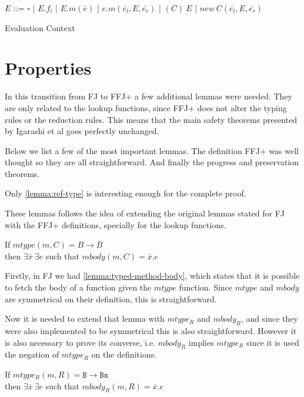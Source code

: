 \begin{table}[h!]
    \centering
    $E$ ::= $\square$ | $E.f_i$ | $E.m(\bar{e})$ | $e.m(\bar{e_l}, E, \bar{e_r})$
    | $(C)~E$ | $new~C(\bar{e_l}, E, \bar{e_r})$
    \label{table:eval-ctx}
    \caption{Evaluation Context}
\end{table}

\section{Properties}
In this transition from \gls{FJ} to \gls{FFJ+} a few additional lemmas were needed.
They are only related to the lookup functions, since \gls{FFJ+} does not alter
the typing rules or the reduction rules. This means that the main safety theorems
presented by Igarashi et al \cite{igarashi_featherweight_2001} goes 
perfectly unchanged.

Below we list a few of the most important lemmas. The definition \gls{FFJ+}
was well thought so they are all straightforward. And finally the progress
and preservation theorems.

Only \cref{lemma:ref-type} is interesting enough for the complete proof.

These lemmas follows the idea of extending the original lemmas stated for
\gls{FJ} with the \gls{FFJ+} definitions, specially for the lookup functions.

\begin{lemma}\label{lemma:typed-method-body}
    If $mtype(m, C) = B \rightarrow \overline{B}$ \\
    then $\exists \bar{x}~\exists e$ such that
        $mbody(m, C) = \bar{x}. e$
\end{lemma}

Firstly, in \gls{FJ} we had \cref{lemma:typed-method-body}, 
which states that it is possible to
fetch the body of a function given the $mtype$ function. Since $mtype$ and
$mbody$ are symmetrical on their definition, this is straightforward.

Now it is needed to extend that lemma with $mtype_R$ and $mbody_R$, and since
they were also implemented to be symmetrical this is also straightforward.
However it is also necessary to prove its converse, i.e. $mbody_R$ implies
$mtype_R$ since it is used the negation of $mtype_R$ on the definitions.

\begin{lemma}
    If $mtype_R(m, R) = \mathtt{B} \rightarrow \mathtt{Bs}$ \\
    then $\exists \bar{x}~\exists e$ such that
        $mbody_R(m, R) = \bar{x}. e$
\end{lemma}

